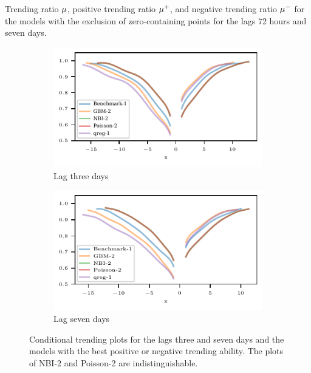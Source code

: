 \begin{table}
    \centering
    
    \caption{Trending ratio $\mu$, positive trending ratio $\mu^+$, and negative trending ratio $\mu^-$ for the models with the exclusion of zero-containing points for the lags 72 hours and seven days.}
    \label{tab:app-eda-trending-ratios}
\end{table}

\begin{figure}
    \centering
    \begin{subfigure}[t]{0.48\textwidth}
    \includegraphics{plots/ed_arrival/50_Cond_Prob_lag_3}
    \caption{Lag three days}
    \end{subfigure}\hfill
    \begin{subfigure}[t]{0.48\textwidth}
    \includegraphics{plots/ed_arrival/50_Cond_Prob_lag_7}
    \caption{Lag seven days}
    \end{subfigure}
    \caption{Conditional trending plots for the lags three and seven days and the models with the best positive or negative trending ability. The plots of NBI-2 and Poisson-2 are indistinguishable.}
    \label{fig:app-eda-cond-prob}
\end{figure}

